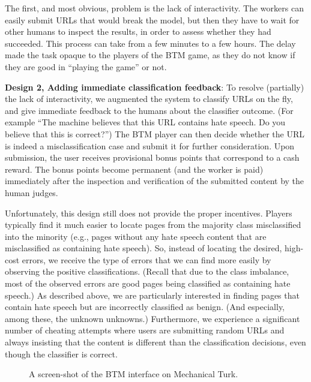 The first, and most obvious, problem is the lack of interactivity.  The workers can easily submit URLs that would break the model, but then they have to wait for other humans to inspect the results, in order to assess whether they had succeeded. This process can take from a few minutes to a few hours. The delay made the task opaque to the players of the BTM game,
as they do not know if they are good in ``playing the game'' or not.

\textbf{Design 2, Adding immediate classification feedback}: To resolve (partially) the lack of interactivity, we augmented the system to classify URLs on the fly, and give immediate feedback to the humans about the classifier outcome. (For example ``The machine believes that this URL contains hate speech.  Do you believe that this is correct?'') The BTM player can then decide whether the URL is indeed a misclassification case and submit it for further consideration. Upon submission, the user receives provisional bonus points that correspond to a cash reward. The bonus points become permanent (and the worker is paid) immediately after the inspection and verification of the submitted content by the human judges.
  

Unfortunately, this design still does not provide the proper incentives. Players typically find it much easier to locate pages from the majority class misclassified into the minority (e.g., pages without any hate speech content that are misclassified as containing hate speech). So, instead of locating the desired, high-cost errors, we receive the type of errors that we can find more easily by observing the positive classifications.  (Recall that due to the class imbalance, most of the observed errors are good pages being classified as containing hate speech.) As described above, we are particularly interested in finding pages that contain hate speech but are incorrectly classified as benign.  (And especially, among these, the unknown unknowns.) Furthermore, we experience a significant number of cheating attempts where users are submitting random URLs and always insisting that the content is different than the classification decisions, even though the classifier is correct.

\begin{figure}[t]
\caption{A screen-shot of the BTM interface on Mechanical Turk.}
\label{fig:btm}
\end{figure}


